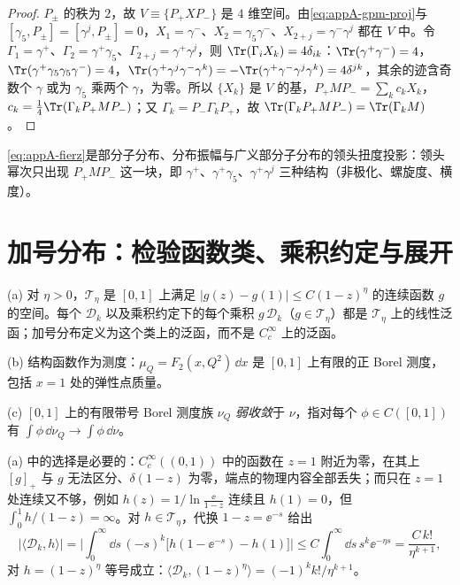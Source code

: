 \begin{proof}
$P_\pm$ 的秩为 $2$，故 $V\equiv\{P_+XP_-\}$ 是 $4$ 维空间。由\cref{eq:appA-gpm-proj}与 $[\gamma_5,P_\pm]=[\gamma^j,P_\pm]=0$，$X_1=\gamma^-$、$X_2=\gamma_5\gamma^-$、$X_{2+j}=\gamma^-\gamma^j$ 都在 $V$ 中。令 $\Gamma_1=\gamma^+$、$\Gamma_2=\gamma^+\gamma_5$、$\Gamma_{2+j}=\gamma^+\gamma^j$，则 $\Tr(\Gamma_iX_k)=4\delta_{ik}$：$\Tr(\gamma^+\gamma^-)=4$，$\Tr(\gamma^+\gamma_5\gamma_5\gamma^-)=4$，$\Tr(\gamma^+\gamma^j\gamma^-\gamma^k)=-\Tr(\gamma^+\gamma^-\gamma^j\gamma^k)=4\delta^{jk}$，其余的迹含奇数个 $\gamma$ 或为 $\gamma_5$ 乘两个 $\gamma$，为零。所以 $\{X_k\}$ 是 $V$ 的基，$P_+MP_-=\sum_kc_kX_k$，$c_k=\frac14\Tr(\Gamma_kP_+MP_-)$；又 $\Gamma_k=P_-\Gamma_kP_+$，故 $\Tr(\Gamma_kP_+MP_-)=\Tr(\Gamma_kM)$。
\end{proof}

\cref{eq:appA-fierz}是部分子分布、分布振幅与广义部分子分布的领头扭度投影：领头幂次只出现 $P_+MP_-$ 这一块，即 $\gamma^+$、$\gamma^+\gamma_5$、$\gamma^+\gamma^j$ 三种结构（非极化、螺旋度、横度）。

\section{加号分布：检验函数类、乘积约定与展开}\label{sec:appA-plus}

\begin{definition}[检验函数类与弱收敛]\label{def:appA-test-functions}
(a) 对 $\eta>0$，$\mathcal T_\eta$ 是 $[0,1]$ 上满足 $|g(z)-g(1)|\le C(1-z)^\eta$ 的连续函数 $g$ 的空间。每个 $\mathcal D_k$ 以及乘积约定下的每个乘积 $g\,\mathcal D_k$（$g\in\mathcal T_\eta$）都是 $\mathcal T_\eta$ 上的线性泛函；加号分布定义为这个类上的泛函，而不是 $C^\infty_c$ 上的泛函。
\par
(b) 结构函数作为测度：$\mu_Q=F_2(x,Q^2)\,\dd x$ 是 $[0,1]$ 上有限的正 Borel 测度，包括 $x=1$ 处的弹性点质量。
\par
(c) $[0,1]$ 上的有限带号 Borel 测度族 $\nu_Q$ \emph{弱收敛}于 $\nu$，指对每个 $\phi\in C([0,1])$ 有 $\int\phi\,\dd\nu_Q\to\int\phi\,\dd\nu$。
\end{definition}

(a) 中的选择是必要的：$C^\infty_c((0,1))$ 中的函数在 $z=1$ 附近为零，在其上 $[g]_+$ 与 $g$ 无法区分、$\delta(1-z)$ 为零，端点的物理内容全部丢失；而只在 $z=1$ 处连续又不够，例如 $h(z)=1/\ln\frac{\ee}{1-z}$ 连续且 $h(1)=0$，但 $\int_0^1h/(1-z)=\infty$。对 $h\in\mathcal T_\eta$，代换 $1-z=\ee^{-s}$ 给出
\begin{equation}\label{eq:appA-Dk-bound}
\big|\langle\mathcal D_k,h\rangle\big|=\Big|\int_0^\infty\dd s\,(-s)^k\big[h(1-\ee^{-s})-h(1)\big]\Big|\le C\int_0^\infty\dd s\,s^k\ee^{-\eta s}=\frac{C\,k!}{\eta^{k+1}},
\end{equation}
对 $h=(1-z)^\eta$ 等号成立：$\langle\mathcal D_k,(1-z)^\eta\rangle=(-1)^kk!/\eta^{k+1}$。

